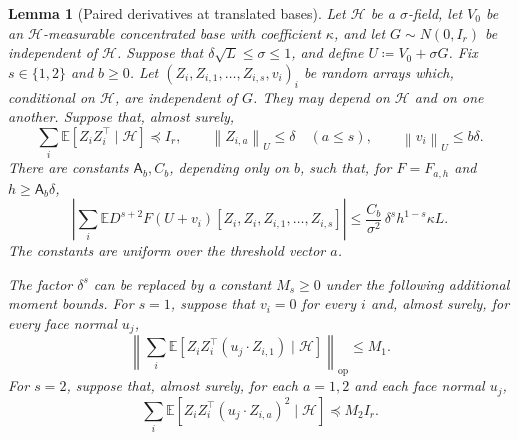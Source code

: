 \documentclass[11pt,letterpaper,twoside,leqno]{article}
\theoremstyle{bookplain}
\newtheorem{lemma}{Lemma}
\theoremstyle{bookremark}
\newcommand{\E}{\mathbb E}
\newcommand{\op}{\mathrm{op}}
\newcommand{\norm}[1]{\left\lVert#1\right\rVert}
\begin{document}
\begin{lemma}[Paired derivatives at translated bases]
\label{appx-an:lem:restoration}
Let \(\mathcal H\) be a \(\sigma\)-field, let \(V_0\) be an
\(\mathcal H\)-measurable concentrated base with coefficient
\(\kappa\), and let \(G\sim N(0,I_r)\) be independent of
\(\mathcal H\). Suppose that \(\delta\sqrt L\le\sigma\le1\),
and define \(U\coloneqq V_0+\sigma G\).
Fix \(s\in\{1,2\}\) and \(b\ge0\).
Let \((Z_i,Z_{i,1},\ldots,Z_{i,s},v_i)_i\) be random arrays
which, conditional on \(\mathcal H\), are independent of \(G\).
They may depend on \(\mathcal H\) and on one another.
Suppose that, almost surely,
\begin{equation}
 \sum_i\E[Z_iZ_i^\top\mid\mathcal H]\preceq I_r,
 \qquad \norm{Z_{i,a}}_U\le\delta\quad(a\le s),
 \qquad \norm{v_i}_U\le b\delta.
 \label{appx-an:conditional-budget}
\end{equation}
There are constants \(\mathsf A_b,C_b\), depending only on \(b\),
such that, for \(F=F_{a,h}\) and \(h\ge\mathsf A_b\delta\),
\begin{equation}
 \left|\sum_i\E D^{s+2}F(U+v_i)
         [Z_i,Z_i,Z_{i,1},\ldots,Z_{i,s}]\right|
 \le\frac{C_b}{\sigma^2}\,
                 \delta^s h^{1-s}\kappa L.
 \label{appx-an:restoration-bound}
\end{equation}
The constants are uniform over the threshold vector \(a\).

The factor \(\delta^s\) can be replaced by a constant \(M_s\ge0\)
under the following additional moment bounds.
For \(s=1\), suppose that \(v_i=0\) for every \(i\) and, almost
surely, for every face normal \(u_j\),
\begin{equation}
 \left\|\sum_i\E[Z_iZ_i^\top(u_j\cdot Z_{i,1})
                    \mid\mathcal H]\right\|_{\op}\le M_1.
 \label{appx-an:signed-cubic-budget}
\end{equation}
For \(s=2\), suppose that, almost surely, for each \(a=1,2\)
and each face normal \(u_j\),
\begin{equation}
 \sum_i\E[Z_iZ_i^\top(u_j\cdot Z_{i,a})^2
                    \mid\mathcal H]\preceq M_2I_r.
 \label{appx-an:weighted-fourth-budget}
\end{equation}
\end{lemma}
\end{document}
